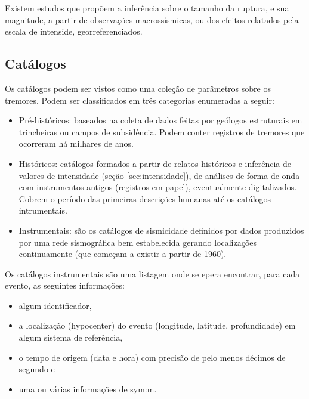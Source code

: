 Existem estudos \citep{bakun_1999} que propõem a inferência sobre o tamanho da ruptura, e sua
magnitude, a partir de observações macrossísmicas, ou dos efeitos relatados pela escala de intenside, georreferenciados.


\subsection{Catálogos}
\label{sec:catalogos}

Os catálogos podem ser vistos como uma coleção de parâmetros sobre os tremores.
Podem ser classificados em três categorias \citep{woessner_2010} enumeradas a seguir:

\begin{itemize}\setlength{\itemsep}{0em}
	\item Pré-históricos: baseados na coleta de dados feitas por
	geólogos estruturais em trincheiras ou campos de subsidência. Podem conter registros de tremores que ocorreram
	há milhares de anos.
	\item Históricos: catálogos formados a partir de relatos históricos e inferência de valores de intensidade
	(seção \ref{sec:intensidade}), de análises de forma de onda com instrumentos antigos (registros em papel), eventualmente
	digitalizados.
	Cobrem o período das primeiras descrições humanas até os catálogos intrumentais.
	\item Instrumentais: são os catálogos de sismicidade definidos por dados produzidos por uma rede sismográfica bem estabelecida
	 gerando localizações continuamente (que começam a existir a partir de 1960).
\end{itemize}

Os catálogos instrumentais são uma listagem onde se epera encontrar, para cada evento, as
seguintes informações:

\begin{itemize}\setlength{\itemsep}{0em}
	\item algum identificador,
	\item a localização (\gls{hypocenter}) do evento (longitude, latitude, profundidade) em algum sistema de referência,
	\item o tempo de origem (data e hora) com precisão de pelo menos décimos de segundo e
	\item uma ou várias informações de \glsdesc{sym:m}.
\end{itemize}

